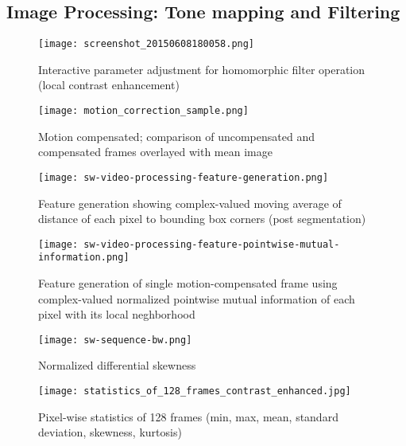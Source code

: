 \documentclass[../main.tex]{subfiles}
\begin{document}
\subsection{Image Processing: Tone mapping and
	Filtering}\label{image-processing-tonemapping-and-filtering}

\begin{figure}[htb]\centering
	\texttt{[image: screenshot\_20150608180058.png]}
	\caption{Interactive parameter adjustment for homomorphic filter operation (local contrast enhancement)}
\end{figure}

\begin{figure}[htb]\centering
	\texttt{[image: motion\_correction\_sample.png]}
	\caption{Motion compensated; comparison of uncompensated and compensated frames overlayed with mean image}
\end{figure}

\begin{figure}[htb]\centering
	\texttt{[image: sw-video-processing-feature-generation.png]}
	\caption{Feature generation showing complex-valued moving average of distance of each pixel to bounding box corners (post segmentation)}
\end{figure}


\begin{figure}[htb]\centering
	\texttt{[image: sw-video-processing-feature-pointwise-mutual-information.png]}
	\caption{Feature generation of single motion-compensated frame using complex-valued normalized pointwise mutual information of each pixel with its local neghborhood}
\end{figure}

\begin{figure}[htb]\centering
	\texttt{[image: sw-sequence-bw.png]}
	\caption{Normalized differential skewness}
\end{figure}


\begin{figure}[htb]\centering
	\texttt{[image: statistics\_of\_128\_frames\_contrast\_enhanced.jpg]}
	\caption{Pixel-wise statistics of 128 frames (min, max, mean, standard deviation, skewness, kurtosis)}
\end{figure}

\clearpage
\end{document}
